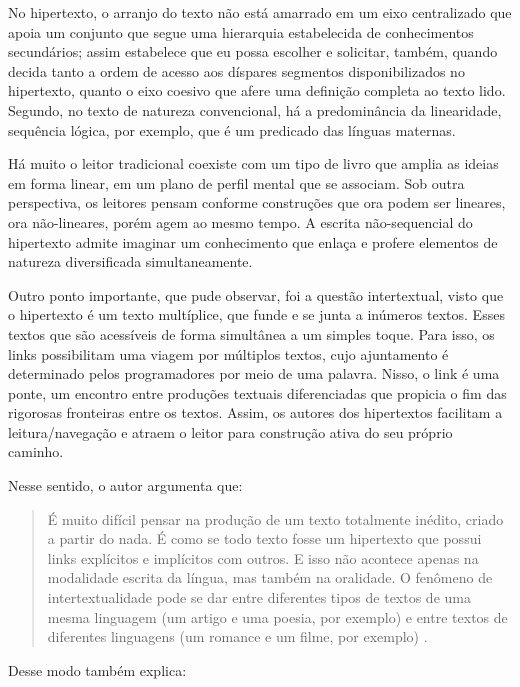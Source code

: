 \begin{refsection}
    No hipertexto, o arranjo do texto não está amarrado em um eixo centralizado que apoia um conjunto que segue uma hierarquia estabelecida de conhecimentos secundários; assim estabelece que eu possa escolher e solicitar, também, quando decida tanto a ordem de acesso aos díspares segmentos disponibilizados no hipertexto, quanto o eixo coesivo que afere uma definição completa ao texto lido. Segundo, no texto de natureza convencional, há a predominância da linearidade, sequência lógica, por exemplo, que é um predicado das línguas maternas.  

    Há muito o leitor tradicional coexiste com um tipo de livro que amplia   as   ideias em forma linear, em um plano de perfil mental que se associam. Sob outra perspectiva, os leitores pensam conforme construções que ora podem ser lineares, ora não-lineares, porém agem ao mesmo tempo. A escrita não-sequencial do hipertexto admite imaginar um conhecimento que enlaça e profere elementos de natureza diversificada simultaneamente.  

    Outro ponto importante, que pude observar, foi a questão intertextual, visto que o hipertexto é um texto multíplice, que funde e se junta a inúmeros textos. Esses textos que são acessíveis de forma simultânea a um simples toque. Para isso, os links possibilitam uma viagem por múltiplos textos, cujo ajuntamento é determinado pelos programadores por meio de uma palavra. Nisso, o link é uma ponte, um encontro entre produções textuais diferenciadas que propicia o fim das rigorosas fronteiras entre os textos. Assim, os autores dos hipertextos facilitam a leitura/navegação e atraem o leitor para construção ativa do seu próprio caminho. 

    Nesse sentido, o autor argumenta que: 

    \begin{quotation}
        É muito difícil pensar na produção de um texto totalmente inédito, criado a partir do nada. É como se todo texto fosse um hipertexto que possui links explícitos e implícitos com outros. E isso não acontece apenas na modalidade escrita da língua, mas também na oralidade. O fenômeno de intertextualidade pode se dar entre diferentes tipos de textos de uma mesma linguagem (um artigo e uma poesia, por exemplo) e entre textos de diferentes linguagens (um romance e um filme, por exemplo) \cite[p.~11]{Nicola2011Painel}. 
    \end{quotation}

    Desse modo \textcite{Xavier2009Era} também explica:


\end{refsection}
